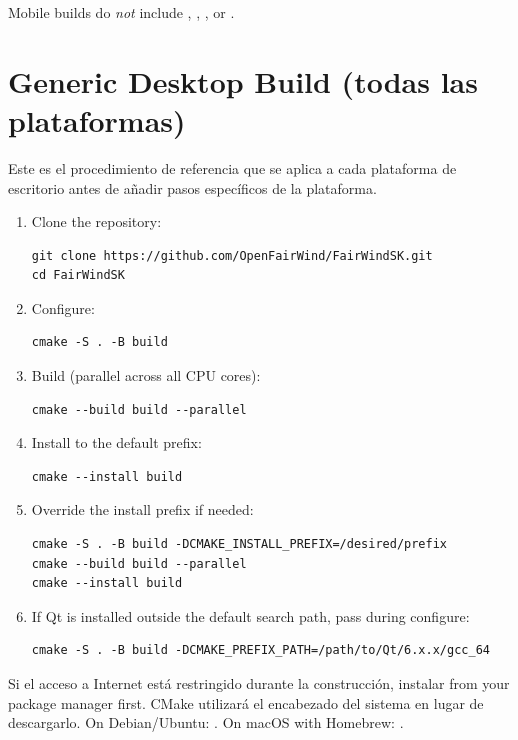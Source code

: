 Mobile builds do \emph{not} include , ,
, or .

\section{Generic Desktop Build (todas las plataformas)}
\label{app:generic}

Este es el procedimiento de referencia que se aplica a cada plataforma de escritorio
antes de añadir pasos específicos de la plataforma.

\begin{enumerate}
  \item Clone the repository:
\begin{lstlisting}
git clone https://github.com/OpenFairWind/FairWindSK.git
cd FairWindSK
\end{lstlisting}

  \item Configure:
\begin{lstlisting}
cmake -S . -B build
\end{lstlisting}

  \item Build (parallel across all CPU cores):
\begin{lstlisting}
cmake --build build --parallel
\end{lstlisting}

  \item Install to the default prefix:
\begin{lstlisting}
cmake --install build
\end{lstlisting}

  \item Override the install prefix if needed:
\begin{lstlisting}
cmake -S . -B build -DCMAKE_INSTALL_PREFIX=/desired/prefix
cmake --build build --parallel
cmake --install build
\end{lstlisting}

  \item If Qt is installed outside the default search path, pass
         during configure:
\begin{lstlisting}
cmake -S . -B build -DCMAKE_PREFIX_PATH=/path/to/Qt/6.x.x/gcc_64
\end{lstlisting}
\end{enumerate}

\begin{tipbox}
Si el acceso a Internet está restringido durante la construcción, instalar
 from your package manager first.
CMake utilizará el encabezado del sistema en lugar de descargarlo.
On Debian/Ubuntu: .
On macOS with Homebrew: .
\end{tipbox}

